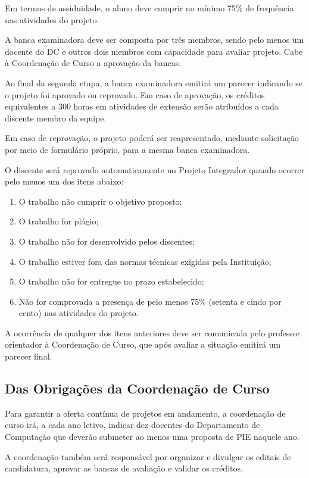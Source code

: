 \documentclass[11pt,a4paper]{report}
\begin{document}
Em termos de assiduidade, o aluno deve cumprir no mínimo 75\% de frequência nas atividades do projeto.

A banca examinadora deve ser composta por três membros, sendo pelo menos um docente do DC e outros dois membros com capacidade para avaliar projeto. Cabe à Coordenação de Curso a aprovação da bancas.

Ao final da segunda etapa, a banca examinadora emitirá um parecer indicando se o projeto foi aprovado ou reprovado. Em caso de aprovação, os créditos equivalentes a 300 horas em atividades de extensão serão atribuídos a cada discente membro da equipe.

Em caso de reprovação, o projeto poderá ser reapresentado, mediante solicitação por meio de formulário próprio, para a mesma banca examinadora.

O discente será reprovado automaticamente no Projeto Integrador quando
ocorrer pelo menos um dos itens abaixo:
\begin{enumerate}
    \item O trabalho não cumprir o objetivo proposto;
    \item O trabalho for plágio;
    \item O trabalho não for desenvolvido pelos discentes;
    \item O trabalho estiver fora das normas técnicas exigidas pela Instituição;
    \item O trabalho não for entregue no prazo estabelecido;
    \item Não for comprovada a presença de pelo menos 75\% (setenta e cindo por cento) nas atividades do projeto.
\end{enumerate}

A ocorrência de qualquer dos itens anteriores deve ser comunicada
pelo professor orientador à Coordenação de Curso, que após avaliar a situação emitirá um parecer final.


\subsection{Das Obrigações da Coordenação de Curso}

Para garantir a oferta contínua de projetos em andamento, a coordenação de curso irá, a cada ano letivo, indicar dez docentes do Departamento de Computação que deverão submeter ao menos uma proposta de PIE naquele ano.

A coordenação também será responsável por organizar e divulgar os editais de candidatura, aprovar as bancas de avaliação e validar os créditos.
\end{document}
